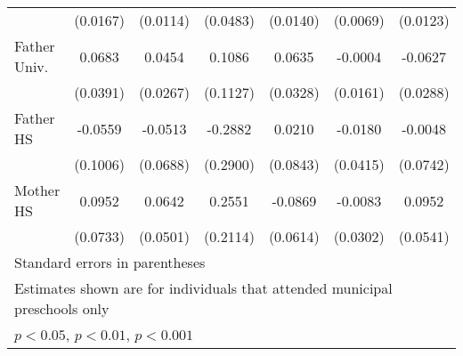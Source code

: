 \begin{table}[htbp]
\begin{tabular}{l*{6}{c}}
            &    (0.0167)         &    (0.0114)         &    (0.0483)         &    (0.0140)         &    (0.0069)         &    (0.0123)         \\
\addlinespace
Father Univ.&      0.0683         &      0.0454         &      0.1086         &      0.0635         &     -0.0004         &     -0.0627\sym{*}  \\
            &    (0.0391)         &    (0.0267)         &    (0.1127)         &    (0.0328)         &    (0.0161)         &    (0.0288)         \\
\addlinespace
Father HS   &     -0.0559         &     -0.0513         &     -0.2882         &      0.0210         &     -0.0180         &     -0.0048         \\
            &    (0.1006)         &    (0.0688)         &    (0.2900)         &    (0.0843)         &    (0.0415)         &    (0.0742)         \\
\addlinespace
Mother HS   &      0.0952         &      0.0642         &      0.2551         &     -0.0869         &     -0.0083         &      0.0952         \\
            &    (0.0733)         &    (0.0501)         &    (0.2114)         &    (0.0614)         &    (0.0302)         &    (0.0541)         \\
\bottomrule
\multicolumn{7}{l}{\footnotesize Standard errors in parentheses}\\
\multicolumn{7}{l}{\footnotesize Estimates shown are for individuals that attended municipal preschools only}\\
\multicolumn{7}{l}{\footnotesize \sym{*} \(p<0.05\), \sym{**} \(p<0.01\), \sym{***} \(p<0.001\)}\\
\end{tabular}
\end{table}
